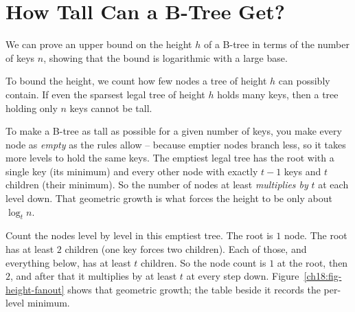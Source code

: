 \section{How Tall Can a B-Tree Get?}

We can prove an upper bound on the height $h$ of a B-tree in terms of the number of keys $n$,
showing that the bound is logarithmic with a large base.

To bound the height, we count how few nodes a tree of height $h$ can possibly contain. If even the
sparsest legal tree of height $h$ holds many keys, then a tree
holding only $n$ keys cannot be tall.

\begin{intuitionbox}
To make a B-tree as tall as possible for a given number of keys, you make every
node as \emph{empty} as the rules allow -- because emptier nodes branch less, so it
takes more levels to hold the same keys. The emptiest legal tree has the root with
a single key (its minimum) and every other node with exactly $t-1$ keys and $t$
children (their minimum). So the number of nodes at least \emph{multiplies by} $t$
at each level down. That geometric growth is what forces the height to be only
about $\log_t n$.
\end{intuitionbox}

Count the nodes level by level in this emptiest tree. The root is $1$ node.
The root has at least $2$ children (one key forces two children). Each of those, and
everything below, has at least $t$ children. So the node count is $1$ at the root,
then $2$, and after that it multiplies by at least $t$ at every step down. Figure~\ref{ch18:fig-height-fanout}
shows that geometric growth; the table beside it records the per-level minimum.

